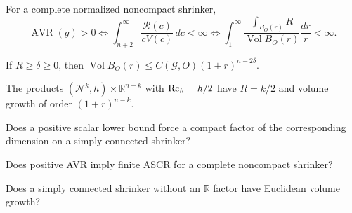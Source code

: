 \begin{proposition}
\label{prop:chow-iv-positive-avr}
For a complete normalized noncompact shrinker,
\[
\operatorname{AVR}(g)>0\iff
\int_{n+2}^{\infty}\frac{\mathcal R(c)}{cV(c)}\,dc<\infty
\iff
\int_1^\infty\frac{\int_{B_O(r)}R}{\operatorname{Vol}B_O(r)}\frac{dr}{r}<\infty.
\]
\end{proposition}

\begin{corollary}
\label{cor:chow-iv-volume-lower-scalar}
If $R\ge\delta\ge0$, then
$\operatorname{Vol}B_O(r)\le C(\mathcal G,O)(1+r)^{n-2\delta}$.
\end{corollary}

\begin{remark}
\label{rem:chow-iv-cylinder-shrinkers}
The products $(\mathcal N^k,h)\times\mathbb R^{n-k}$ with $\operatorname{Rc}_h=h/2$ have
$R=k/2$ and volume growth of order $(1+r)^{n-k}$.
\end{remark}

\begin{claim}
\label{ques:chow-iv-compact-factor}
Does a positive scalar lower bound force a compact factor of the corresponding
dimension on a simply connected shrinker?
\end{claim}

\begin{claim}
\label{ques:chow-iv-positive-avr-finite-ascr}
Does positive AVR imply finite ASCR for a complete noncompact shrinker?
\end{claim}

\begin{claim}
\label{ques:chow-iv-euclidean-growth-no-line}
Does a simply connected shrinker without an $\mathbb R$ factor have Euclidean
volume growth?
\end{claim}

